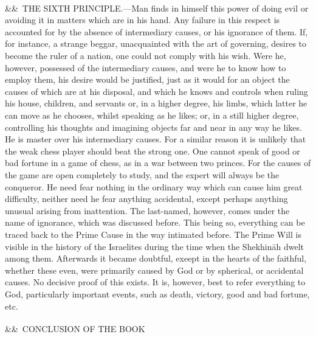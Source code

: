 \documentclass[12pt]{article}
\newcommand{\para}[1][]{\par\noindent\ifx&#1&\else\textsuperscript{\footnotesize #1}~\fi}
\begin{document}
\para THE SIXTH PRINCIPLE.---Man finds in himself this power of doing evil or avoiding it in matters which are in his hand. Any failure in this respect is accounted for by the absence of intermediary causes, or his ignorance of them. If, for instance, a strange beggar, unacquainted with the art of governing, desires to become the ruler of a nation, one could not comply with his wish. Were he, however, possessed of the intermediary causes, and were he to know how to employ them, his desire would be justified, just as it would for an object the causes of which are at his disposal, and which he knows and controls when ruling his house, children, and servants or, in a higher degree, his limbs, which latter he can move as he chooses, whilst speaking as he likes; or, in a still higher degree, controlling his thoughts and imagining objects far and near in any way he likes. He is master over his intermediary causes. For a similar reason it is unlikely that the weak chess player should beat the strong one. One cannot speak of good or bad fortune in a game of chess, as in a war between two princes. For the causes of the game are open completely to study, and the expert will always be the conqueror. He need fear nothing in the ordinary way which can cause him great difficulty, neither need he fear anything accidental, except perhaps anything unusual arising from inattention. The last-named, however, comes under the name of ignorance, which was discussed before. This being so, everything can be traced back to the Prime Cause in the way intimated before. The Prime Will is visible in the history of the Israelites during the time when the Shekhināh dwelt among them. Afterwards it became doubtful, exeept in the hearts of the faithful, whether these even, were primarily caused by God or by spherical, or accidental causes. No decisive proof of this exists. It is, however, best to refer everything to God, particularly important events, such as death, victory, good and bad fortune, etc.

\para CONCLUSION OF THE BOOK
\end{document}

